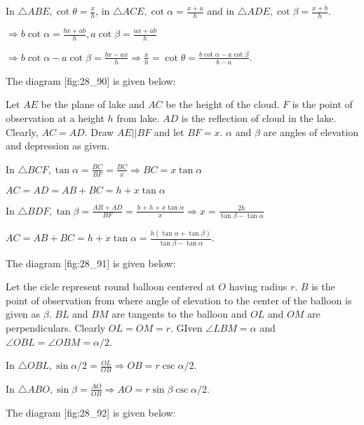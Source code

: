   In $\triangle ABE, \cot\theta = \frac{x}{h}$, in $\triangle ACE, \cot\alpha = \frac{x + a}{h}$ and in
  $\triangle ADE, \cot\beta = \frac{x + b}{h}$.

  $\Rightarrow b\cot\alpha = \frac{bx + ab}{h}, a\cot\beta = \frac{ax + ab}{h}$

  $\Rightarrow b\cot\alpha - a\cot\beta = \frac{bx - ax}{h}\Rightarrow \frac{x}{h} = \cot\theta = \frac{b\cot\alpha - a\cot\beta}{b - a}$.

\item The diagram [fig:28_90] is given below:

  \startplacefigure[reference=fig:28_90]
    \externalfigure[28_90.pdf]
  \stopplacefigure

  Let $AE$ be the plane of lake and $AC$ be the height of the cloud. $F$ is the point of observation at a
  height $h$ from lake. $AD$ is the reflection of cloud in the lake. Clearly, $AC = AD$. Draw $AE || BF$
  and let $BF = x$. $\alpha$ and $\beta$ are angles of elevation and depression as given.

  In $\triangle BCF, \tan\alpha = \frac{BC}{BF} = \frac{BC}{x}\Rightarrow BC = x\tan\alpha$

  $AC = AD = AB + BC = h + x\tan\alpha$

  In $\triangle BDF, \tan\beta = \frac{AB + AD}{BF} = \frac{h + h + x\tan\alpha}{x} \Rightarrow x = \frac{2h}{\tan\beta -
    \tan\alpha}$

  $AC = AB + BC = h + x\tan\alpha = \frac{h(\tan\alpha + \tan\beta)}{\tan\beta - \tan\alpha}$.

\item The diagram [fig:28_91] is given below:

  \startplacefigure[reference=fig:28_91]
    \externalfigure[28_91.pdf]
  \stopplacefigure

  Let the cicle represent round balloon centered at $O$ having radius $r$. $B$ is the point of observation from
  where angle of elevation to the center of the balloon is given as $\beta$. $BL$ and $BM$ are tangents to the
  balloon and $OL$ and $OM$ are perpendiculars. Clearly $OL = OM = r$. GIven $\angle LBM = \alpha$ and
  $\angle OBL = \angle OBM = \alpha/2$.

  In $\triangle OBL, \sin\alpha/2 = \frac{OL}{OB} \Rightarrow OB = r\csc\alpha/2$.

  In $\triangle ABO, \sin\beta = \frac{AO}{OB}\Rightarrow AO = r\sin\beta\csc\alpha/2$.

\item The diagram [fig:28_92] is given below:

